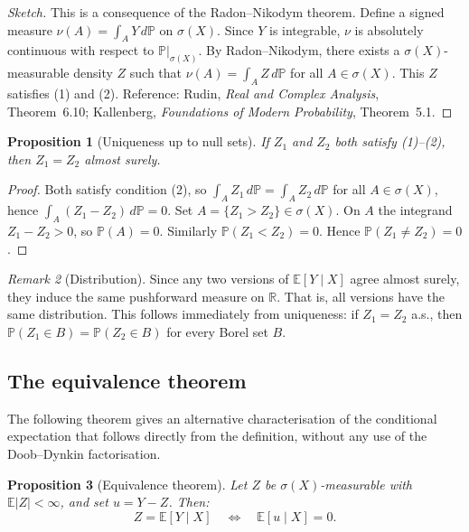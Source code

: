 \documentclass[a4paper,oneside,12pt]{extarticle}
\theoremstyle{plain}
\newtheorem{proposition}{Proposition}
\theoremstyle{definition}
\theoremstyle{remark}
\newtheorem{remark}[proposition]{Remark}
\newcommand*{\E}{\mathbb{E}}
\newcommand*{\mP}{\mathbb{P}}
\newcommand*{\mR}{\mathbb{R}}
\begin{document}
\begin{proof}[Sketch]
This is a consequence of the Radon--Nikodym theorem. Define a signed
measure $\nu(A) = \int_A Y\,d\mP$ on $\sigma(X)$. Since $Y$ is
integrable, $\nu$ is absolutely continuous with respect to $\mP|_{\sigma(X)}$.
By Radon--Nikodym, there exists a $\sigma(X)$-measurable density $Z$
such that $\nu(A) = \int_A Z\,d\mP$ for all $A \in \sigma(X)$. This $Z$
satisfies (1) and (2).
Reference: Rudin, \textit{Real and Complex Analysis}, Theorem~6.10;
Kallenberg, \textit{Foundations of Modern Probability}, Theorem~5.1.
\end{proof}

\begin{proposition}[Uniqueness up to null sets]
If $Z_1$ and $Z_2$ both satisfy (1)--(2), then $Z_1 = Z_2$ almost surely.
\end{proposition}

\begin{proof}
Both satisfy condition (2), so $\int_A Z_1\,d\mP = \int_A Z_2\,d\mP$
for all $A \in \sigma(X)$, hence $\int_A (Z_1 - Z_2)\,d\mP = 0$.
Set $A = \{Z_1 > Z_2\} \in \sigma(X)$. On $A$ the integrand $Z_1 - Z_2 > 0$,
so $\mP(A) = 0$. Similarly $\mP(Z_1 < Z_2) = 0$.
Hence $\mP(Z_1 \neq Z_2) = 0$.
\end{proof}

\begin{remark}[Distribution]
Since any two versions of $\E[Y \mid X]$ agree almost surely, they
induce the same pushforward measure on $\mR$. That is, all versions
have the same distribution. This follows immediately from uniqueness:
if $Z_1 = Z_2$ a.s., then $\mP(Z_1 \in B) = \mP(Z_2 \in B)$ for
every Borel set $B$.
\end{remark}

\subsection{The equivalence theorem}

The following theorem gives an alternative characterisation of the
conditional expectation that follows directly from the definition,
without any use of the Doob--Dynkin factorisation.

\begin{proposition}[Equivalence theorem]
Let $Z$ be $\sigma(X)$-measurable with $\E|Z| < \infty$, and set
$u = Y - Z$. Then:
\[
  Z = \E[Y \mid X] \quad \Longleftrightarrow \quad \E[u \mid X] = 0.
\]
\end{proposition}
\end{document}
